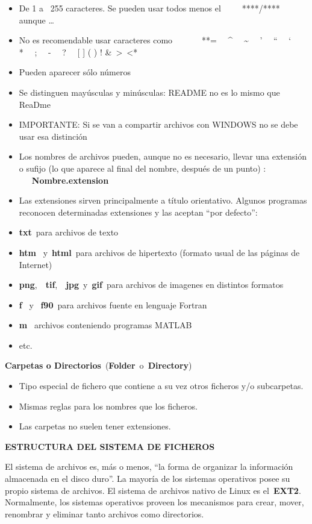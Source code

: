 \documentclass[
  letterpaper,
]{article}
\providecommand{\tightlist}{%
  \setlength{\itemsep}{0pt}\setlength{\parskip}{0pt}}\usepackage{longtable,booktabs,array}
\begin{document}
\begin{itemize}
\item
  De 1 a~ 255 caracteres. Se pueden usar todos menos
  el~~~~~****/****~~~~~ aunque \ldots{}
\item
  No es recomendable usar caracteres como~~~~~~~**=~~ \^{}~~
  \textasciitilde~~ '~~ ``~~ `~~ *~~ ;~~ -~~ ?~~ {[} {]} ( ) !
  \&~\textgreater~\textless**
\item
  Pueden aparecer sólo números
\item
  Se distinguen mayúsculas y minúsculas: README no es lo mismo que
  ReaDme
\item
  IMPORTANTE: Si se van a compartir archivos con WINDOWS no se debe usar
  esa distinción
\item
  Los nombres de archivos pueden, aunque no es necesario, llevar una
  extensión o sufijo (lo que aparece al final del nombre, después de un
  punto) : ~~~\textbf{Nombre.extension}
\item
  Las extensiones sirven principalmente a título orientativo. Algunos
  programas reconocen determinadas extensiones y las aceptan ``por
  defecto'':
\item
  \textbf{txt}~para archivos de texto
\item
  \textbf{htm}~ y~\textbf{html}~para archivos de hipertexto (formato
  usual de las páginas de Internet)
\item
  \textbf{png},~~\textbf{tif},~~\textbf{jpg}~y~\textbf{gif}~para
  archivos de imagenes en distintos formatos
\item
  \textbf{f}~ y ~\textbf{f90}~para archivos fuente en lenguaje Fortran
\item
  \textbf{m}~ archivos conteniendo programas MATLAB
\item
  etc.
\end{itemize}

\textbf{Carpetas o Directorios}~(\textbf{Folder}~o~\textbf{Directory})

\begin{itemize}
\tightlist
\item
  Tipo especial de fichero que contiene a su vez otros ficheros y/o
  subcarpetas.
\item
  Mismas reglas para los nombres que los ficheros.
\item
  Las carpetas no suelen tener extensiones.
\end{itemize}

\textbf{ESTRUCTURA DEL SISTEMA DE FICHEROS}

El sistema de archivos es, más o menos, ``la forma de organizar la
información almacenada en el disco duro''. La mayoría de los sistemas
operativos posee su propio sistema de archivos. El sistema de archivos
nativo de Linux es el~\textbf{EXT2}. Normalmente, los sistemas
operativos proveen los mecanismos para crear, mover, renombrar y
eliminar tanto archivos como directorios.
\end{document}
